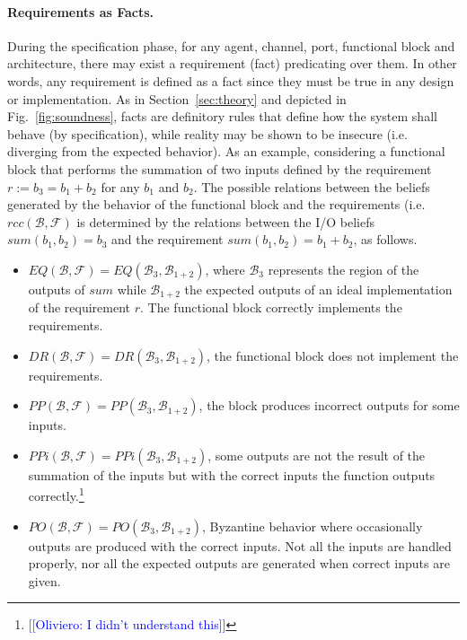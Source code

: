 \documentclass[runningheads]{llncs}
\newcommand{\beliefRegion}{\mathcal{B}}
\newcommand{\factRegion}{\mathcal{F}}
\newcommand{\Rcc}[2]{rcc(#1,#2)}
\newcommand{\eq}[2]{EQ(#1,#2)}
\newcommand{\pp}[2]{PP(#1,#2)}
\newcommand{\po}[2]{PO(#1,#2)}
\newcommand{\ppi}[2]{PPi(#1,#2)}
\newcommand{\dr}[2]{DR(#1,#2)}
\newcommand{\ON}[1]{\footnote{\textcolor{blue}{[[Oliviero: #1]]}}}
\begin{document}
\paragraph{Requirements as Facts.}
During the specification phase, for any agent, channel, port, functional block
and architecture, there may exist a requirement (fact) predicating over them.
In other words, any requirement is defined as a fact since they must be true in
any design or implementation. As in Section~\ref{sec:theory} and depicted in
Fig.~\ref{fig:soundness}, facts are definitory rules that define how
the system shall behave (by specification), while reality may be shown to
be insecure (i.e. diverging from the expected behavior).
As an example, considering a functional block that performs the summation of two
inputs defined by the requirement $r := b_3 = b_1
+ b_2$ for any $b_1$ and $b_2$. The possible relations between the beliefs generated by the behavior of the functional block and
the requirements (i.e. $\Rcc{\beliefRegion}{\factRegion}$ is determined by
the relations between the I/O beliefs $sum(b_1,b_2)=b_3$ and the requirement
$sum(b_1,b_2)=b_1+b_2$, as follows.
\begin{itemize}
	\item $\eq{\beliefRegion}{\factRegion}=\eq{\beliefRegion_3}{\beliefRegion_{1+2}}$, 
		where $\beliefRegion_3$ represents the region of the
		outputs of $sum$ while
		$\beliefRegion_{1+2}$ the expected
		outputs of an ideal implementation of the requirement $r$.
		The functional block correctly implements the
		requirements.
	\item
		$\dr{\beliefRegion}{\factRegion}=\dr{\beliefRegion_3}{\beliefRegion_{1+2}}$,
		the functional block does not implement the requirements.
	\item
		$\pp{\beliefRegion}{\factRegion}=\pp{\beliefRegion_3}{\beliefRegion_{1+2}}$, the block produces incorrect outputs for some inputs.
	\item $\ppi{\beliefRegion}{\factRegion}=\ppi{\beliefRegion_3}{\beliefRegion_{1+2}}$, some outputs are not the result of the summation of the inputs but with the correct inputs the function outputs correctly.\ON{I didn't understand this}
	\item
		$\po{\beliefRegion}{\factRegion}=\po{\beliefRegion_3}{\beliefRegion_{1+2}}$,
		Byzantine behavior where occasionally
		outputs are produced with the correct inputs. Not all
		the inputs are handled properly, nor all the expected outputs
		are generated when correct inputs are given.
\end{itemize}
\end{document}
